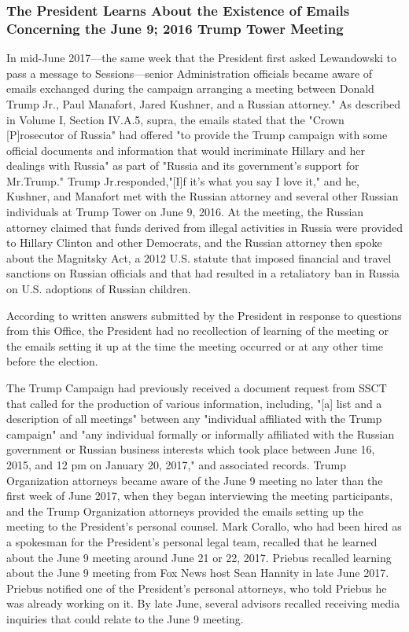 \subsubsection{The President Learns About the Existence of Emails Concerning the June 9; 2016 Trump Tower Meeting}

In mid-June 2017—the same week that the President first asked Lewandowski to pass a message to Sessions—senior Administration officials became aware of emails exchanged during the campaign arranging a meeting between Donald Trump Jr., Paul Manafort, Jared Kushner, and a Russian attorney."%
As described in Volume I, Section IV.A.5, supra, the emails stated that the "Crown [P]rosecutor of Russia" had offered "to provide the Trump campaign with some official documents and information that would incriminate Hillary and her dealings with Russia" as part of "Russia and its government's support for Mr.Trump."%
Trump Jr.responded,"[I]f it's what you say I love it,"%
and he, Kushner, and Manafort met with the Russian attorney and several other Russian individuals at Trump Tower on June 9, 2016.%
At the meeting, the Russian attorney claimed that funds derived from illegal activities in Russia were provided to Hillary Clinton and other Democrats, and the Russian attorney then spoke about the Magnitsky Act, a 2012 U.S. statute that imposed financial and travel sanctions on Russian officials and that had resulted in a retaliatory ban in Russia on U.S. adoptions of Russian children.%

According to written answers submitted by the President in response to questions from this Office, the President had no recollection of learning of the meeting or the emails setting it up at the time the meeting occurred or at any other time before the election.%

The Trump Campaign had previously received a document request from SSCT that called for the production of various information, including, "[a] list and a description of all meetings" between any "individual affiliated with the Trump campaign" and "any individual formally or informally affiliated with the Russian government or Russian business interests which took place between June 16, 2015, and 12 pm on January 20, 2017," and associated records.%
Trump Organization attorneys became aware of the June 9 meeting no later than the first week of June 2017, when they began interviewing the meeting participants, and the Trump Organization attorneys provided the emails setting up the meeting to the President's personal counsel.%
Mark Corallo, who had been hired as a spokesman for the President's personal legal team, recalled that he learned about the June 9 meeting around June 21 or 22, 2017.%
Priebus recalled learning about the June 9 meeting from Fox News host Sean Hannity in late June 2017.%
Priebus notified one of the President's personal attorneys, who told Priebus he was already working on it.%
By late June, several advisors recalled receiving media inquiries that could relate to the June 9 meeting.%

